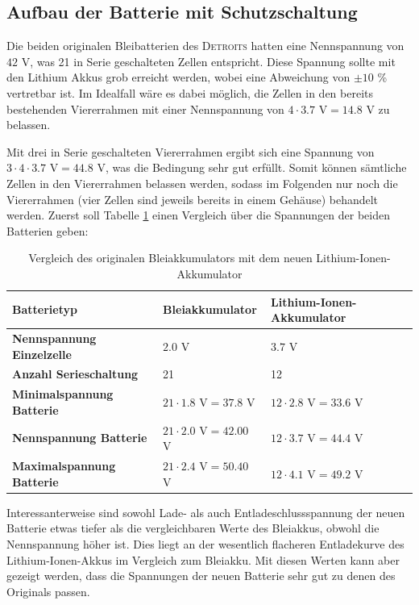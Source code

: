 \subsection{Aufbau der Batterie mit Schutzschaltung}
Die beiden originalen Bleibatterien des \textsc{Detroits} hatten eine Nennspannung von $42$ V, was 21 in Serie geschalteten Zellen entspricht. Diese Spannung sollte mit den Lithium Akkus grob erreicht werden, wobei eine Abweichung von $\pm 10$ \% vertretbar ist. Im Idealfall wäre es dabei möglich, die Zellen in den bereits bestehenden Viererrahmen mit einer Nennspannung von $4\cdot 3.7$ V$=14.8$ V zu belassen.

Mit drei in Serie geschalteten Viererrahmen ergibt sich eine Spannung von $3\cdot 4\cdot 3.7$ V$=44.8$ V, was die Bedingung sehr gut erfüllt. Somit können sämtliche Zellen in den Viererrahmen belassen werden, sodass im Folgenden nur noch die Viererrahmen (vier Zellen sind jeweils bereits in einem Gehäuse) behandelt werden. Zuerst soll Tabelle \ref{tab:bat_vergl} einen Vergleich über die Spannungen der beiden Batterien geben:

\begin{table}[h]
\centering
\begin{tabular}{|l|l|l|}
\hline
\textbf{Batterietyp}              & \textbf{Bleiakkumulator} & \textbf{Lithium-Ionen-Akkumulator} \\ \hline
\textbf{Nennspannung Einzelzelle} & $2.0$ V                            & $3.7$ V                                    \\ \hline
\textbf{Anzahl Serieschaltung}    & 21                                  & 12                                          \\ \hline
\textbf{Minimalspannung Batterie} & $21\cdot1.8$ V$=37.8$ V           & $12\cdot2.8$ V$=33.6$ V                     \\ \hline
\textbf{Nennspannung Batterie}    & $21\cdot2.0$ V$=42.00$ V           & $12\cdot3.7$ V$=44.4$ V                    \\ \hline
\textbf{Maximalspannung Batterie} & $21\cdot2.4$ V$=50.40$ V            & $12\cdot4.1$ V$=49.2$ V                     \\ \hline
\end{tabular}
\caption{Vergleich des originalen Bleiakkumulators mit dem neuen Lithium-Ionen-Akkumulator}
\label{tab:bat_vergl}
\end{table}

Interessanterweise sind sowohl Lade- als auch Entladeschlussspannung der neuen Batterie etwas tiefer als die vergleichbaren Werte des Bleiakkus, obwohl die Nennspannung höher ist. Dies liegt an der wesentlich flacheren Entladekurve des Lithium-Ionen-Akkus im Vergleich zum Bleiakku. Mit diesen Werten kann aber gezeigt werden, dass die Spannungen der neuen Batterie sehr gut zu denen des Originals passen.

